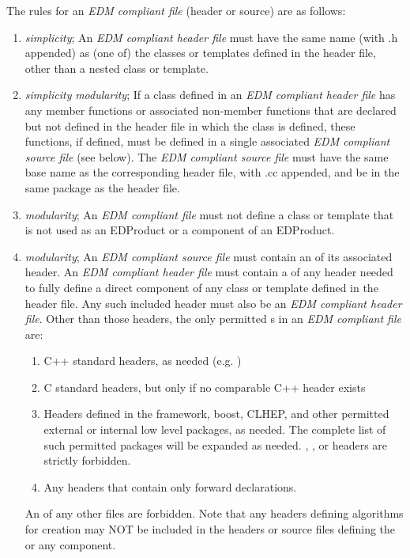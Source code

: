 \documentclass[draftmode]{memarticle}
\newcommand{\Pool}{\productname{Pool}}
\newcommand{\Root}{\productname{Root}}
\newcommand{\Seal}{\productname{Seal}}
\newcommand{\EDProduct}{\classname{ED\-Product}}
\begin{document}
The rules for an \emph{EDM compliant file} (header or source) are as follows:

\begin{enumerate}
	\item \emph{simplicity}; An \emph{EDM compliant header file} must have the same name (with .h appended) as (one of) the classes or templates defined in the header file, other than a nested class or template.

	\item \emph{simplicity} \emph{modularity}; If a class defined in an \emph{EDM compliant header file} has any member functions or associated non-member functions that are declared but not defined in the header file in which the class is defined, these functions, if defined, must be defined in a single associated \emph{EDM compliant source file} (see below).  The \emph{EDM compliant source file} must have the same base name as the corresponding header file, with .cc appended, and be in the same package as the header file.

	\item \emph{modularity}; An \emph{EDM compliant file} must not define a class or template that is not used as an EDProduct or a component of an EDProduct.

	\item \emph{modularity}; An \emph{EDM compliant source file} must contain an  of its associated header.  An \emph{EDM compliant header file} must contain a  of any header needed to fully define a direct component of any class or template defined in the header file.  Any such included header must also be an \emph{EDM compliant header file}.  Other than those headers, the only permitted s in an \emph{EDM compliant file} are:
	\begin{enumerate}
		\item C++ standard headers, as needed (e.g. )

		\item C standard headers, but only if no comparable C++ header exists

		\item Headers defined in the framework, boost, CLHEP, and other permitted external or internal low level packages, as needed.  The complete list of such permitted packages will be expanded as needed.  \Pool, \Seal, or \Root headers are strictly forbidden.

		\item Any headers that contain only forward declarations.

	\end{enumerate}
	An  of any other files are forbidden.  Note that any headers defining algorithms for \EDProduct creation may NOT be included in the headers or source files defining the \EDProduct or any component.

\end{enumerate}
\end{document}
